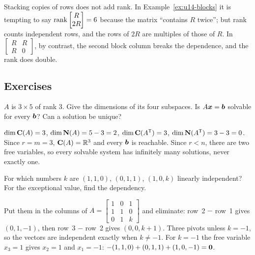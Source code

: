 \begin{trap}
Stacking copies of rows does not add rank. In Example~\ref{ex:u14-blocks} it is tempting to say
$\operatorname{rank}\begin{bmatrix}R\\2R\end{bmatrix}=6$ because the matrix ``contains $R$ twice''; but rank
counts independent rows, and the rows of $2R$ are multiples of those of $R$. In
$\begin{bmatrix}R&R\\R&0\end{bmatrix}$, by contrast, the second block column breaks the dependence,
and the rank does double.
\end{trap}

\subsection{Exercises}

\begin{exercise}\label{exr:u14-dims}
$A$ is $3\times5$ of rank $3$. Give the dimensions of its four subspaces. Is $A\boldsymbol{x}=\boldsymbol{b}$
solvable for every $\boldsymbol{b}$? Can a solution be unique?
\end{exercise}
\begin{solution}
$\dim\mathbf{C}(A)=3$, $\dim\mathbf{N}(A)=5-3=2$, $\dim\mathbf{C}(A^{\mathsf{T}})=3$, $\dim\mathbf{N}(A^{\mathsf{T}})=3-3=0$. Since $r=m=3$,
$\mathbf{C}(A)=\mathbb{R}^3$ and every $\boldsymbol{b}$ is reachable. Since $r<n$, there are two free variables, so every
solvable system has infinitely many solutions, never exactly one.
\end{solution}

\begin{exercise}\label{exr:u14-k}
For which numbers $k$ are $(1,1,0)$, $(0,1,1)$, $(1,0,k)$ linearly independent? For the exceptional
value, find the dependency.
\end{exercise}
\begin{solution}
Put them in the columns of $A=\begin{bmatrix}1&0&1\\1&1&0\\0&1&k\end{bmatrix}$ and eliminate:
row~2 $-$ row~1 gives $(0,1,-1)$, then row~3 $-$ row~2 gives $(0,0,k+1)$. Three pivots unless
$k=-1$, so the vectors are independent exactly when $k\ne-1$. For $k=-1$ the free variable
$x_3=1$ gives $x_2=1$ and $x_1=-1$: $-(1,1,0)+(0,1,1)+(1,0,-1)=\boldsymbol{0}$.
\end{solution}

